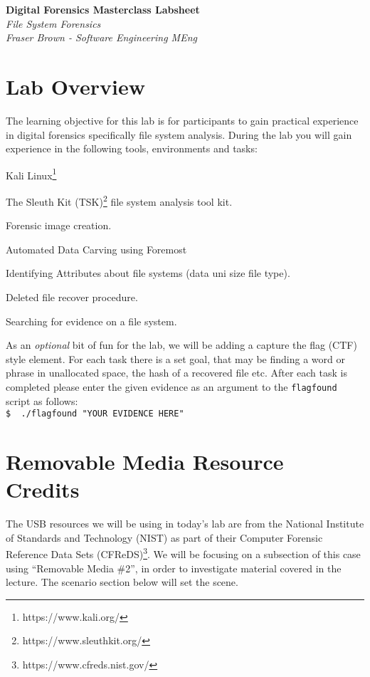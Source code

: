 \documentclass[a4paper,11pt]{article}
\author{Fraser Brown}
\date{\today}
\begin{document}
\begin{titlepage}
   \begin{center}
      \Large\textbf{Digital Forensics Masterclass Labsheet}\\
      \large\textit{File System Forensics}\\
      \large\textit{Fraser Brown - Software Engineering MEng}
   \end{center}
\end{titlepage}

\tableofcontents
\newpage

\section{Lab Overview}
The learning objective for this lab is for participants to gain practical experience in digital forensics specifically file system analysis. During the lab you will gain experience in the following tools, environments and tasks:
\begin{itemize*}
	\item Kali Linux\footnote{https://www.kali.org/}
	\item The Sleuth Kit (TSK)\footnote{https://www.sleuthkit.org/} file system analysis tool kit.
	\item Forensic image creation.
	\item Automated Data Carving using Foremost
	\item Identifying Attributes about file systems (data uni size file type).
	\item Deleted file recover procedure.
	\item Searching for evidence on a file system.
\end{itemize*}

As an \textit{optional} bit of fun for the lab, we will be adding a capture the flag (CTF) style element. For each task there is a set goal, that may be finding a word or phrase in unallocated space, the hash of a recovered file etc. After each task is completed please enter the given evidence as an argument to the \texttt{flagfound} script as follows:\\
\verb|$  ./flagfound "YOUR EVIDENCE HERE"|


\section{Removable Media Resource Credits}
The USB resources we will be using in today's lab are from the National Institute of Standards and Technology (NIST) as part of their Computer Forensic Reference Data Sets (CFReDS)\footnote{https://www.cfreds.nist.gov/}.  We will be focusing on a subsection of this case using ``Removable Media {\#}2'', in order to investigate material covered in the lecture. The scenario section below will set the scene. \\
 
\end{document}
